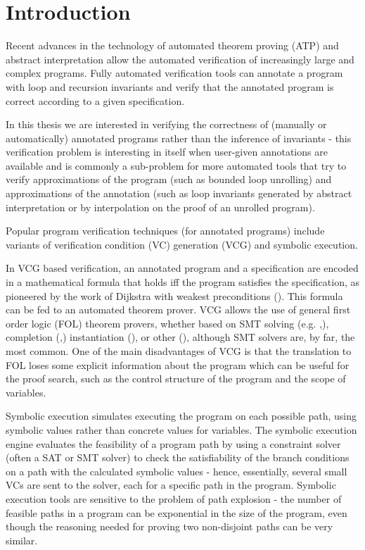 \chapter{Introduction}
Recent advances in the technology of automated theorem proving (ATP) and abstract interpretation allow the automated verification of increasingly large and complex programs.
Fully automated verification tools can annotate a program with loop and recursion invariants and verify that the annotated program is correct according to a given specification. 

In this thesis we are interested in verifying the correctness of (manually or automatically) annotated programs rather than the inference of invariants - this verification problem is interesting in itself when user-given annotations are available and is commonly a sub-problem for more automated tools that try to verify approximations of the program (such as bounded loop unrolling) and approximations of the annotation (such as loop invariants generated by abstract interpretation or by interpolation on the proof of an unrolled program).

Popular program verification techniques (for annotated programs) include variants of verification condition (VC) generation (VCG) and symbolic execution.

In VCG based verification, an annotated program and a specification are encoded in a mathematical formula that holds iff the program satisfies the specification, as pioneered by the work of Dijkstra with weakest preconditions (\cite{Dijkstra:1975:GCN:360933.360975}). This formula can be fed to an automated theorem prover. VCG allows the use of general first order logic (FOL) theorem provers, whether based on SMT solving (e.g. \cite{DBLP:conf/cav/BarrettCDHJKRT11},\cite{DBLP:conf/tacas/MouraB08}), completion (\cite{HJL99},\cite{DBLP:conf/cade/RiazanovV99}) instantiation (\cite{Korovin2008}), or other (\cite{BaumgartnerPelzerTinelli12}), although SMT solvers are, by far, the most common. 
One of the main disadvantages of VCG is that the translation to FOL loses some explicit information about the program which can be useful for the proof search, such as the control structure of the program and the scope of variables.

Symbolic execution simulates executing the program on each possible path, using symbolic values rather than concrete values for variables. The symbolic execution engine evaluates the feasibility of a program path by using a constraint solver (often a SAT or SMT solver) to check the satisfiability of the branch conditions on a path with the calculated symbolic values - hence, essentially, several small VCs are sent to the solver, each for a specific path in the program. Symbolic execution tools are sensitive to the problem of path explosion - the number of feasible paths in a program can be exponential in the size of the program, even though the reasoning needed for proving two non-disjoint paths can be very similar.


